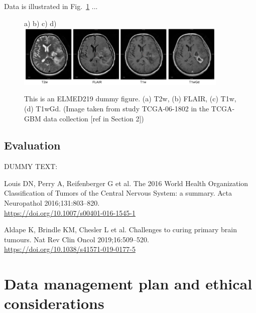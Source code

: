 \documentclass[11pt]{article}
\begin{document}
Data is illustrated in Fig.~\ref{fig:elmed219-dummy} ...

\begin{figure}[H]
a)  \hspace{32mm} b) \hspace{32mm}  c) \hspace{32mm}  d) \\
\includegraphics[width=0.9\textwidth]{elmed219_dummy_fig.png}
\caption{This is an ELMED219 dummy figure. (a) T2w, (b) FLAIR, (c) T1w, (d) T1wGd. (Image taken from study TCGA-06-1802 in the TCGA-GBM data collection [ref \cite{TCGA-GBM} in Section 2])}
\label{fig:elmed219-dummy}
\end{figure}



\subsection{Evaluation}

DUMMY TEXT:
\lipsum[7]


\begin{footnotesize}
\begin{thebibliography}{14} 

 Louis DN, Perry A, Reifenberger G  et al. The 2016 World Health Organization Classification of Tumors of the Central Nervous System: a summary. Acta Neuropathol 2016;131:803–820.\\ \scriptsize{\url{https://doi.org/10.1007/s00401-016-1545-1}}

 Aldape K, Brindle KM, Chesler L et al. Challenges to curing primary brain tumours. Nat Rev Clin Oncol 2019;16:509–520.\\ \scriptsize{\url{https://doi.org/10.1038/s41571-019-0177-5}}


\end{thebibliography}
\end{footnotesize}

\newpage

\section{Data management plan and ethical considerations}
\end{document}
